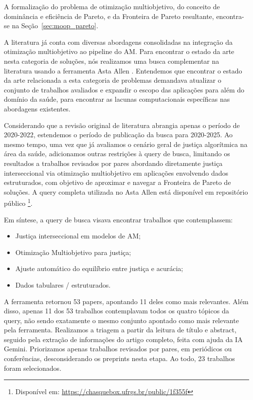 A formalização do problema de otimização multiobjetivo, do conceito de dominância e eficiência de Pareto, e da Fronteira de Pareto resultante, encontra-se na Seção~\ref{sec:moop_pareto}.

A literatura já conta com diversas abordagens consolidadas na integração da otimização multiobjetivo ao pipeline do AM. Para encontrar o estado da arte nesta categoria de soluções, nós realizamos uma busca complementar na literatura usando a ferramenta Asta Allen \cite{asta}. Entendemos que encontrar o estado da arte relacionada a esta categoria de problemas demandava atualizar o conjunto de trabalhos avaliados e expandir o escopo das aplicações para além do domínio da saúde, para encontrar as lacunas computacionais específicas nas abordagens existentes.

Considerando que a revisão original de literatura abrangia apenas o período de 2020-2022, estendemos o período de publicação da busca para 2020-2025. Ao mesmo tempo, uma vez que já avaliamos o cenário geral de justiça algorítmica na área da saúde, adicionamos outras restrições à query de busca, limitando os resultados a trabalhos revisados por pares abordando diretamente justiça interseccional via otimização multiobjetivo em aplicações envolvendo dados estruturados, com objetivo de aproximar e navegar a Fronteira de Pareto de soluções. A query completa utilizada no Asta Allen está disponível em repositório público \footnote{Disponível em: \url{https://chasquebox.ufrgs.br/public/1f355f}}.

Em síntese, a query de busca visava encontrar trabalhos que contemplassem:
\begin{itemize}
    \item Justiça interseccional em modelos de AM;
    \item Otimização Multiobjetivo para justiça;
    \item Ajuste automático do equilíbrio entre justiça e acurácia;
    \item Dados tabulares / estruturados.
\end{itemize}

A ferramenta retornou 53 papers, apontando 11 deles como mais relevantes. Além disso, apenas 11 dos 53 trabalhos contemplavam todos os quatro tópicos da query, não sendo exatamente o mesmo conjunto apontado como mais relevante pela ferramenta. Realizamos a triagem a partir da leitura de título e abstract, seguido pela extração de informações do artigo completo, feita com ajuda da IA Gemini. Priorizamos apenas trabalhos revisados por pares, em periódicos ou conferências, desconsiderando os preprints nesta etapa. Ao todo, 23 trabalhos foram selecionados.


